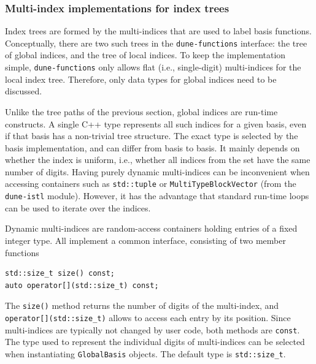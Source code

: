 \documentclass[a4paper,10pt,headings=normal,bibliography=totoc]{scrartcl}
\newcommand{\cpp}[1]{\lstinline[basicstyle=\ttfamily]!#1!}
\newcommand{\dunemodule}[1]{\texttt{#1}}
\begin{document}
\subsubsection{Multi-index implementations for index trees}
\label{sec:multi_indicies_for_index_trees}

Index trees are formed by the multi-indices that are used to label basis functions.
Conceptually, there are two such trees in the \dunemodule{dune-functions} interface:
the tree of global indices, and the tree of local indices.  To keep the implementation simple,
\dunemodule{dune-functions} only allows flat (i.e., single-digit) multi-indices for the local index tree.
Therefore, only data types for global indices need to be discussed.

Unlike the tree paths of the previous section,
global indices are run-time constructs.  A single C++ type represents all such
indices for a given basis, even if that basis has a non-trivial tree structure.
The exact type is selected by the basis implementation, and can differ from basis to basis.
It mainly depends on whether the index is uniform, i.e., whether all indices from the
set have the same number of digits.
Having purely dynamic multi-indices can be inconvenient when accessing
containers such as \cpp{std::tuple}
or \cpp{MultiTypeBlockVector} (from the \dunemodule{dune-istl}
module). However, it has the advantage that standard run-time loops can be used
to iterate over the indices.

Dynamic multi-indices are random-access containers holding entries of a fixed integer type.
All implement a common interface, consisting of two member functions
%
\begin{lstlisting}[style=Interface]
std::size_t size() const;
auto operator[](std::size_t) const;
\end{lstlisting}
%
The \cpp{size()} method returns the number of digits of the multi-index,
and \cpp{operator[](std::size_t)} allows to access
each entry by its position. Since multi-indices are
typically not changed by user code, both methods are \cpp{const}.
The type used to represent
the individual digits of multi-indices can be selected when instantiating \cpp{GlobalBasis}
objects.  The default type is \cpp{std::size_t}.
\end{document}
